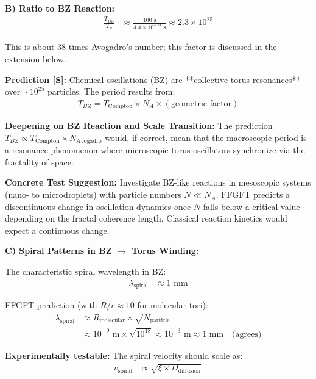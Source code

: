 	\textbf{B) Ratio to BZ Reaction:}
	\begin{align*}
		\frac{T_{BZ}}{T_p} &\approx \frac{100 \text{ s}}{4.4 \times 10^{-24} \text{ s}} \approx 2.3 \times 10^{25}
	\end{align*}
	
	This is about 38 times Avogadro's number; this factor is discussed in the extension below.
	
	\textbf{Prediction [S]:} Chemical oscillations (BZ) are **collective torus resonances** over $\sim 10^{25}$ particles. The period results from:
	\begin{align*}
		T_{BZ} = T_{\text{Compton}} \times N_A \times (\text{geometric factor})
	\end{align*}
	
	\textbf{Deepening on BZ Reaction and Scale Transition:}
	The prediction $T_{BZ} \propto T_{\text{Compton}} \times N_{\text{Avogadro}}$ would, if correct, mean that the macroscopic period is a resonance phenomenon where microscopic torus oscillators synchronize via the fractality of space.
	
	\textbf{Concrete Test Suggestion:} Investigate BZ-like reactions in mesoscopic systems (nano- to microdroplets) with particle numbers $N \ll N_A$. FFGFT predicts a discontinuous change in oscillation dynamics once $N$ falls below a critical value depending on the fractal coherence length. Classical reaction kinetics would expect a continuous change.
	
	\textbf{C) Spiral Patterns in BZ $\rightarrow$ Torus Winding:}
	
	The characteristic spiral wavelength in BZ:
	\begin{align*}
		\lambda_{\text{spiral}} &\approx 1 \text{ mm}
	\end{align*}
	
	FFGFT prediction (with $R/r \approx 10$ for molecular tori):
	\begin{align*}
		\lambda_{\text{spiral}} &\approx R_{\text{molecular}} \times \sqrt{N_{\text{particle}}} \\
		&\approx 10^{-9} \text{ m} \times \sqrt{10^{18}} \approx 10^{-3} \text{ m} \approx 1 \text{ mm} \quad \text{(agrees)}
	\end{align*}
	
	\textbf{Experimentally testable:} The spiral velocity should scale as:
	\begin{align*}
		v_{\text{spiral}} &\propto \sqrt{\xi \times D_{\text{diffusion}}}
	\end{align*}
	
